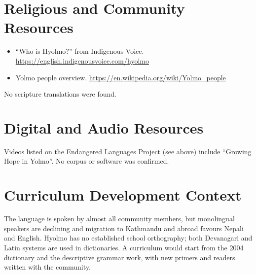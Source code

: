 \documentclass[12pt]{article}
\begin{document}
\section{Religious and Community Resources}
\begin{itemize}
\item ``Who is Hyolmo?'' from Indigenous Voice. \url{https://english.indigenousvoice.com/hyolmo}
\item Yolmo people overview. \url{https://en.wikipedia.org/wiki/Yolmo_people}
\end{itemize}
No scripture translations were found.

\section{Digital and Audio Resources}
Videos listed on the Endangered Languages Project (see above) include ``Growing Hope in Yolmo''. No corpus or software was confirmed.

\section{Curriculum Development Context}
The language is spoken by almost all community members, but monolingual speakers are declining and migration to Kathmandu and abroad favours Nepali and English. Hyolmo has no established school orthography; both Devanagari and Latin systems are used in dictionaries. A curriculum would start from the 2004 dictionary and the descriptive grammar work, with new primers and readers written with the community.
\end{document}
